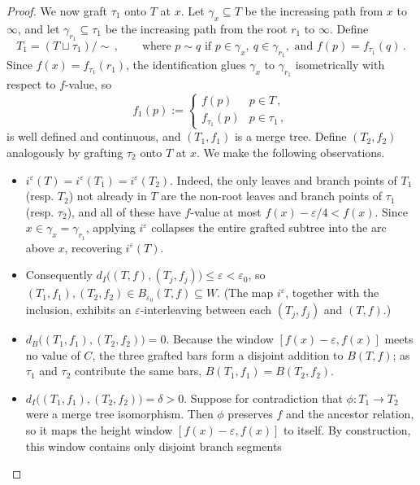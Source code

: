 \documentclass{article}
\theoremstyle{definition}
\renewcommand{\epsilon}{\varepsilon}
\begin{document}
\begin{proof}
    We now graft $\tau_1$ onto $T$ at $x$. Let $\gamma_x \subseteq T$ be the increasing path from $x$ to $\infty$, and let $\gamma_{r_1} \subseteq \tau_1$ be the increasing path from the root $r_1$ to $\infty$. Define
    \begin{equation*}
        T_1 = (T \sqcup \tau_1)/\sim\,, \qquad \text{where } p \sim q \text{ if } p \in \gamma_x,\ q\in\gamma_{r_1}, \text{ and } f(p) = f_{\tau_1}(q)\,.
    \end{equation*}
    Since $f(x) = f_{\tau_1}(r_1)$, the identification glues $\gamma_x$ to $\gamma_{r_1}$ isometrically with respect to $f$-value, so
    \begin{equation*}
        f_1(p) := \begin{cases}
            f(p) & p \in T\,,\\
            f_{\tau_1}(p) & p \in \tau_1\,,
        \end{cases}
    \end{equation*}
    is well defined and continuous, and $(T_1,f_1)$ is a merge tree. Define $(T_2,f_2)$ analogously by grafting $\tau_2$ onto $T$ at $x$. We make the following observations.
    \begin{itemize}
        \item $i^\epsilon(T) = i^\epsilon(T_1) = i^\epsilon(T_2)$. Indeed, the only leaves and branch points of $T_1$ (resp. $T_2$) not already in $T$ are the non-root leaves and branch points of $\tau_1$ (resp. $\tau_2$), and all of these have $f$-value at most $f(x) - \epsilon/4 < f(x)$. Since $x \in \gamma_x = \gamma_{r_1}$, applying $i^\epsilon$ collapses the entire grafted subtree into the arc above $x$, recovering $i^\epsilon(T)$.
        \item Consequently $d_I\big((T,f),(T_j,f_j)\big) \leq \epsilon < \epsilon_0$, so $(T_1,f_1),(T_2,f_2)\in B_{\epsilon_0}(T,f) \subseteq W$. (The map $i^\epsilon$, together with the inclusion, exhibits an $\epsilon$-interleaving between each $(T_j,f_j)$ and $(T,f)$.)
        \item $d_B\big((T_1,f_1),(T_2,f_2)\big)=0$. Because the window $[f(x)-\epsilon, f(x)]$ meets no value of $C$, the three grafted bars form a disjoint addition to $B(T,f)$; as $\tau_1$ and $\tau_2$ contribute the same bars, $B(T_1,f_1) = B(T_2,f_2)$.
     \item $d_I\big((T_1,f_1), (T_2, f_2)\big) = \delta>0$. Suppose for contradiction that $\phi:T_1 \to T_2$ were a merge tree isomorphism. Then $\phi$ preserves $f$ and the ancestor relation, so it maps the height window $[f(x)-\epsilon, f(x)]$ to itself. By construction, this window contains only disjoint branch segments

\end{itemize}
\end{proof}
\end{document}
